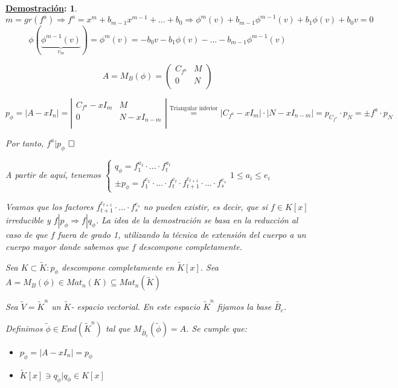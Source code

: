 \documentclass[10pt,a4paper,openright]{book}
\theoremstyle{break}
\newtheorem*{demo}{\underline{Demostración}:}
\begin{document}
\begin{demo}
$$m= gr(f^a) \Rightarrow f^a = x^m + b_{m-1}x^{m-1} + \ldots + b_0  \Rightarrow \phi^m(v) + b_{m-1} \phi^{m-1} (v) + b_1 \phi(v) + b_0 v = 0$$
$$\phi(\underbrace{\phi^{m-1}(v)}_{v_m}) = \phi^m (v) = -b_0 v - b_1 \phi(v) - \ldots - b_{m-1} \phi^{m-1} (v) $$

$$A = M_B (\phi) = \left(\begin{array}{c|c}
C_{f^a} & M \\
\hline
0 & N   \\
\end{array}
\right)$$

$p_\phi = |A - xI_n| = \left|\begin{array}{c|c}
C_{f^a} - xI_m & M \\
\hline
0 & N - xI_{n-m}  \\
\end{array}
\right| \overset{\mbox{Triangular inferior}}{=} |C_{f^a} - xI_m| \cdot |N - xI_{n-m}| = p_{C_{f^a}} \cdot p_N = \pm f^a \cdot p_N$

Por tanto, $f^a | p_\phi$
$\hfill\square$

A partir de aquí, tenemos
$\begin{cases} q_\phi = f^{a_1}_1 \cdot \ldots \cdot f^{a_t}_t \\
\pm p_\phi =  f^{e_1}_1 \cdot \ldots \cdot f^{e_t}_t \cdot f^{e_{t+1}}_{t+1} \cdot \ldots \cdot f^{e_s}_s  \end{cases} 1  \leq a_i \leq e_i$

Veamos que los factores $f^{e_{t+1}}_{t+1} \cdot \ldots \cdot f^{e_s}_s $ no pueden existir, es decir, que si $f \in K[x]$ irreducible y $f | p_\phi \Rightarrow f | q_\phi$. La idea de la demostración se basa en la reducción al caso de que $f$ fuera de grado 1, utilizando la técnica de extensión del cuerpo a un cuerpo mayor donde sabemos que $f$ descompone completamente.

Sea $K \subset \tilde{K} : p_\phi $ descompone completamente en $\tilde{K}[x]$. Sea $A = M_B (\phi) \in Mat_n(K) \subseteq Mat_n(\tilde{K})$

Sea $\tilde{V} = \tilde{K}^n$ un $\tilde{K}$- espacio vectorial. En este espacio $\tilde{K}^n$ fijamos la base $\tilde{B_c}$.

Definimos $\tilde{\phi} \in End(\tilde{K}^n)$ tal que $M_{\tilde{B_c}}(\tilde{\phi}) = A$. Se cumple que:
\begin{itemize}
\item $p_{\tilde{\phi}} = |A - xI_n| = p_\phi$

\item $\tilde{K}[x] \ni q_{\tilde{\phi}} | q_\phi \in K[x]$
\end{itemize}


\end{demo}
\end{document}

